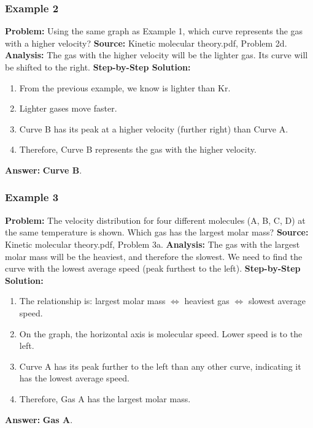 \documentclass{article}
\begin{document}
\subsubsection{Example 2}
\textbf{Problem:} Using the same graph as Example 1, which curve represents the gas with a higher velocity?
\textbf{Source:} Kinetic molecular theory.pdf, Problem 2d.
\textbf{Analysis:} The gas with the higher velocity will be the lighter gas. Its curve will be shifted to the right.
\textbf{Step-by-Step Solution:}
\begin{enumerate}
    \item From the previous example, we know  is lighter than Kr.
    \item Lighter gases move faster.
    \item Curve B has its peak at a higher velocity (further right) than Curve A.
    \item Therefore, Curve B represents the gas with the higher velocity.
\end{enumerate}
\textbf{Answer:} \textbf{Curve B}.

\subsubsection{Example 3}
\textbf{Problem:} The velocity distribution for four different molecules (A, B, C, D) at the same temperature is shown. Which gas has the largest molar mass?
\textbf{Source:} Kinetic molecular theory.pdf, Problem 3a.
\textbf{Analysis:} The gas with the largest molar mass will be the heaviest, and therefore the slowest. We need to find the curve with the lowest average speed (peak furthest to the left).
\textbf{Step-by-Step Solution:}
\begin{enumerate}
    \item The relationship is: largest molar mass $\iff$ heaviest gas $\iff$ slowest average speed.
    \item On the graph, the horizontal axis is molecular speed. Lower speed is to the left.
    \item Curve A has its peak further to the left than any other curve, indicating it has the lowest average speed.
    \item Therefore, Gas A has the largest molar mass.
\end{enumerate}
\textbf{Answer:} \textbf{Gas A}.
\end{document}
